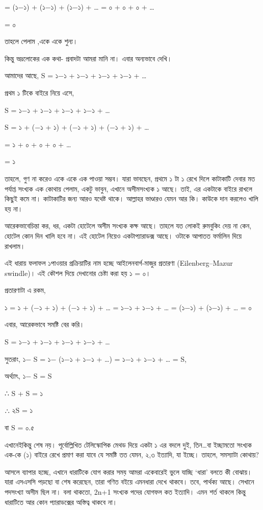 \documentclass[
]{book}
\begin{document}
= (১−১) + (১−১) + (১−১) + \ldots{} = ০ + ০ + ০ + \ldots{}

= ০

তাহলে পেলাম ,একে একে শুন্য।

কিন্তু ভদ্রলোকের এক কথা- প্রবাদটা আমরা মানি না। এবার অন্যভাবে দেখি।

আমাদের আছে, S = ১−১ + ১−১ + ১−১ + ১−১ + \ldots{}

প্রথম ১ টিকে বাইরে নিয়ে এসে,

S = ১−১ + ১−১ + ১−১ + ১−১ + \ldots{}

S = ১ + (−১ + ১) + (−১ + ১) + (−১ + ১) + \ldots{}

= ১ + ০ + ০ + ০ + \ldots{}

= ১

তাহলে, গুণ না করেও একে একে এক পাওয়া সম্ভব। যারা ভাবছেন, প্রথমে ১ টা ১ রেখে দিলে কাটাকাটি দেবার মত পর্যাপ্ত সংখ্যক এক কোথায় পেলাম, একটু ভাবুন, এখানে অসীমসংখ্যক ১ আছে। তাই, এর একটাকে বাইরে রাখলে কিছুই কমে না। কাটাকাটির জন্য আরও যথেষ্ট থাকে। আল্লাহর ভাণ্ডারও যেমন আর কি। কাউকে দান করলেও খালি হয় না।

আরেকভাবেচিন্তা কর, ধর, একটা হোটেলে অসীম সংখ্যক কক্ষ আছে। তাহলে যত লোকই রুমবুকিং দেয় না কেন, হোটেল কোন দিন খালি হবে না। এই হোটেল নিয়েও একটাপ্যারাডক্স আছে। ওটাকে আপাতত ফর্মালিন দিয়ে রাখলাম।

এই ধারায় ফলাফল ১পাওয়ার প্রক্রিয়াটির নাম হচ্ছে আইলেনবার্গ-মাজুর প্রতারণা (Eilenberg--Mazur swindle)। এই কৌশল দিয়ে দেখানোর চেষ্টা করা হয় ১ = ০।

প্রতারণাটা এ রকম,

১ = ১ + (−১ + ১) + (−১ + ১) + \ldots{} = ১−১ + ১−১ + \ldots{} = (১−১) + (১−১) + \ldots{} = ০

এবার, আরেকভাবে সমষ্টি বের করি।

S = ১−১ + ১−১ + ১−১ + ১−১ + \ldots{}

সুতরাং, ১− S = ১− (১−১ + ১−১ + \ldots) = ১−১ + ১−১ + \ldots{} = S,

অর্থ্যাৎ, ১− S = S

∴ S + S = ১

∴ ২S = ১

বা S = ০.৫

এখানেইকিন্তু শেষ নয়। পূর্বোল্লিখিত টেলিস্কোপিক মেথড দিয়ে একটা ১ এর বদলে দুই, তিন\ldots বা ইচ্ছামতো সংখ্যক এক-কে (১) বাইরে রেখে প্রমাণ করা যাবে যে সমষ্টি তত যেমন, ২,৩ ইত্যাদি, যা ইচ্ছে। তাহলে, সমস্যাটা কোথায়?

আসলে ব্যাপার হচ্ছে, এখানে ধারাটিকে যোগ করার সময় আমরা একেবারেই ভুলে যাচ্ছি `ধারা' বলতে কী বোঝায়। যারা এসএসসি পড়ছো বা শেষ করেছেন, তারা গণিত বইয়ে এমনধারা দেখে থাকবে। তবে, পার্থক্য আছে। সেখানে পদসংখ্যা অসীম ছিল না। বলা থাকতো, 2n+1 সংখ্যক পদের যোগফল কত ইত্যাদি। এমন শর্ত থাকলে কিন্তু ধারাটিতে আর কোন প্যারাডক্সের অস্তিত্ব থাকবে না।
\end{document}

